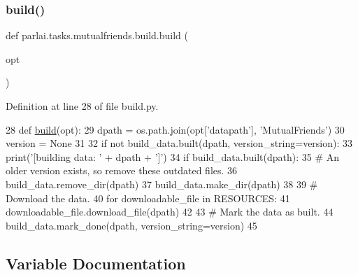 \subsubsection{\texorpdfstring{build()}{build()}}
{\footnotesize\ttfamily def parlai.\+tasks.\+mutualfriends.\+build.\+build (\begin{DoxyParamCaption}\item[{}]{opt }\end{DoxyParamCaption})}



Definition at line 28 of file build.\+py.


\begin{DoxyCode}
28 \textcolor{keyword}{def }\hyperlink{namespacedialog__babi__feedback_1_1build_a7a9d289f7493a5ded13c4b7f071b6184}{build}(opt):
29     dpath = os.path.join(opt[\textcolor{stringliteral}{'datapath'}], \textcolor{stringliteral}{'MutualFriends'})
30     version = \textcolor{keywordtype}{None}
31 
32     \textcolor{keywordflow}{if} \textcolor{keywordflow}{not} build\_data.built(dpath, version\_string=version):
33         print(\textcolor{stringliteral}{'[building data: '} + dpath + \textcolor{stringliteral}{']'})
34         \textcolor{keywordflow}{if} build\_data.built(dpath):
35             \textcolor{comment}{# An older version exists, so remove these outdated files.}
36             build\_data.remove\_dir(dpath)
37         build\_data.make\_dir(dpath)
38 
39         \textcolor{comment}{# Download the data.}
40         \textcolor{keywordflow}{for} downloadable\_file \textcolor{keywordflow}{in} RESOURCES:
41             downloadable\_file.download\_file(dpath)
42 
43         \textcolor{comment}{# Mark the data as built.}
44         build\_data.mark\_done(dpath, version\_string=version)
45 \end{DoxyCode}


\subsection{Variable Documentation}
\mbox{\label{namespaceparlai_1_1tasks_1_1mutualfriends_1_1build_a72b8fc7fca28e8cc2479b811900b9901}} 
